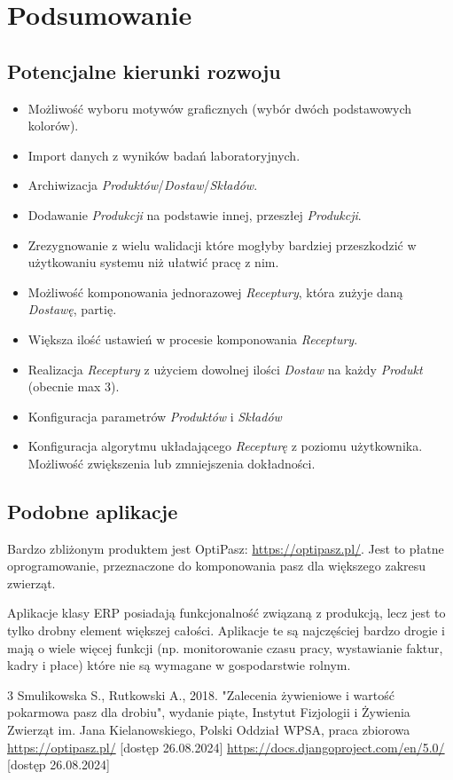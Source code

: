 \documentclass[shortabstract]{iithesis}
\begin{document}
\chapter{Podsumowanie}

\section{Potencjalne kierunki rozwoju}
\begin{itemize}
	\item Możliwość wyboru motywów graficznych (wybór dwóch podstawowych kolorów).
	\item Import danych z wyników badań laboratoryjnych.
	\item Archiwizacja \textit{Produktów}/\textit{Dostaw}/\textit{Składów}.
	\item Dodawanie \textit{Produkcji} na podstawie innej, przeszłej \textit{Produkcji}.
	\item Zrezygnowanie z wielu walidacji które mogłyby bardziej przeszkodzić w użytkowaniu systemu niż ułatwić pracę z nim.
	\item Możliwość komponowania jednorazowej \textit{Receptury}, która zużyje daną \textit{Dostawę}, partię.
	\item Większa ilość ustawień w procesie komponowania \textit{Receptury}.
	\item Realizacja \textit{Receptury} z użyciem dowolnej ilości \textit{Dostaw} na każdy \textit{Produkt} (obecnie max 3).
	\item Konfiguracja parametrów \textit{Produktów} i \textit{Składów}
	\item Konfiguracja algorytmu układającego \textit{Recepturę} z poziomu użytkownika. Możliwość zwiększenia lub zmniejszenia dokładności.
\end{itemize}

\section{Podobne aplikacje}

Bardzo zbliżonym produktem jest OptiPasz: \url{https://optipasz.pl/}. Jest to płatne oprogramowanie, przeznaczone do komponowania pasz dla większego zakresu zwierząt.

Aplikacje klasy ERP posiadają funkcjonalność związaną z produkcją, lecz jest to tylko drobny element większej całości. Aplikacje te są najczęściej bardzo drogie i mają o wiele więcej funkcji (np. monitorowanie czasu pracy, wystawianie faktur, kadry i płace) które nie są wymagane w gospodarstwie rolnym.


\begin{thebibliography}{3}
 Smulikowska S., Rutkowski A., 2018. "Zalecenia żywieniowe i wartość pokarmowa pasz dla drobiu",{} wydanie piąte, Instytut Fizjologii i Żywienia Zwierząt im. Jana Kielanowskiego, Polski Oddział WPSA, praca zbiorowa
 \url{https://optipasz.pl/} [dostęp 26.08.2024]
 \url{https://docs.djangoproject.com/en/5.0/} [dostęp 26.08.2024]
\end{thebibliography}
\end{document}
